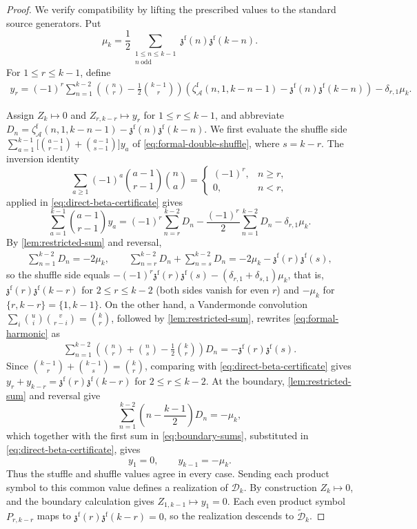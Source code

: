 \documentclass[12pt]{amsart}
\numberwithin{equation}{section}
\theoremstyle{plain}
\newcommand{\zaf}[1]{\zeta_{\mathcal A}^{\mathrm f}(#1)}
\newcommand{\zzf}[1]{\mathfrak z^{\mathrm f}(#1)}
\newcommand{\Dk}{\mathcal D_k}
\newcommand{\Dtk}{\widetilde{\mathcal D}_k}
\begin{document}
\begin{proof}
We verify compatibility by lifting the prescribed values to the standard
source generators. Put
\[
 \mu_k=\frac12
 \sum_{\substack{1\leq n\leq k-1\\n\ \mathrm{odd}}}
 \zzf n\zzf{k-n}.
\]
For $1\leq r\leq k-1$, define
\begin{align}\label{eq:direct-beta-certificate}
 y_r=(-1)^r\sum_{n=1}^{k-2}
 \left(\binom nr-\frac12\binom{k-1}r\right)
 \left(\zaf{n,1,k-n-1}-\zzf n\zzf{k-n}\right)
 -\delta_{r,1}\mu_k.
\end{align}

Assign $Z_k\mapsto0$ and $Z_{r,k-r}\mapsto y_r$ for
$1\leq r\leq k-1$, and abbreviate
$D_n=\zaf{n,1,k-n-1}-\zzf n\zzf{k-n}$.
We first evaluate the shuffle side
$\sum_{a=1}^{k-1}\bigl[\binom{a-1}{r-1}+\binom{a-1}{s-1}\bigr]y_a$ of
\eqref{eq:formal-double-shuffle}, where $s=k-r$. The inversion
identity
\[
 \sum_{a\geq1}(-1)^a\binom{a-1}{r-1}\binom na=
 \begin{cases}
  (-1)^r,&n\geq r,\\
  0,&n<r,
 \end{cases}
\]
applied in \eqref{eq:direct-beta-certificate} gives
\[
 \sum_{a=1}^{k-1}\binom{a-1}{r-1}y_a
 =(-1)^r\sum_{n=r}^{k-2}D_n
 -\frac{(-1)^r}2\sum_{n=1}^{k-2}D_n
 -\delta_{r,1}\mu_k.
\]
By \cref{lem:restricted-sum} and reversal,
\begin{align}\label{eq:boundary-sums}
 \sum_{n=1}^{k-2}D_n=-2\mu_k,
 \qquad
 \sum_{n=r}^{k-2}D_n+\sum_{n=s}^{k-2}D_n=-2\mu_k-\zzf r\zzf s,
\end{align}
so the shuffle side equals
$-(-1)^r\zzf r\zzf s-(\delta_{r,1}+\delta_{s,1})\mu_k$, that is,
$\zzf r\zzf{k-r}$ for $2\leq r\leq k-2$ (both sides vanish for even
$r$) and $-\mu_k$ for $\{r,k-r\}=\{1,k-1\}$. On the other hand, a
Vandermonde convolution
$\sum_i\binom ui\binom v{r-i}=\binom kr$,
followed by \cref{lem:restricted-sum}, rewrites
\eqref{eq:formal-harmonic} as
\begin{align}\label{eq:harmonic-binomial-direct}
 \sum_{n=1}^{k-2}
 \left(\binom nr+\binom ns-\frac12\binom kr\right)D_n
 =-\zzf r\zzf s.
\end{align}
Since
$\binom{k-1}r+\binom{k-1}{s}=\binom kr$, comparing with
\eqref{eq:direct-beta-certificate} gives
$y_r+y_{k-r}=\zzf r\zzf{k-r}$ for
$2\leq r\leq k-2$. At the boundary,
\cref{lem:restricted-sum} and reversal give
\[
 \sum_{n=1}^{k-2}\left(n-\frac{k-1}{2}\right)D_n=-\mu_k,
\]
which together with the first sum in \eqref{eq:boundary-sums},
substituted in \eqref{eq:direct-beta-certificate}, gives
\[
 y_1=0,\qquad y_{k-1}=-\mu_k.
\]
Thus the stuffle and shuffle values agree in every case. Sending each
product symbol to this common value defines a realization of $\Dk$.
By construction $Z_k\mapsto0$, and the boundary calculation gives
$Z_{1,k-1}\mapsto y_1=0$. Each even product symbol $P_{r,k-r}$ maps to
$\zzf r\zzf{k-r}=0$, so the realization descends to $\Dtk$.


\end{proof}
\end{document}
